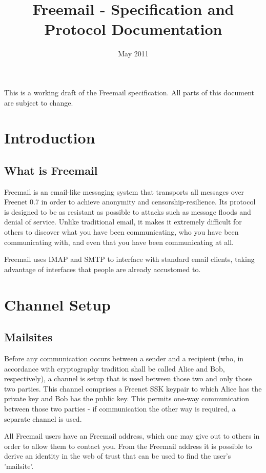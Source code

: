 \documentclass[12pt,a4paper]{article}
\begin{document}
\title{Freemail - Specification and Protocol Documentation}
\date{May 2011}
\maketitle

This is a working draft of the Freemail specification. All parts of this document are subject to
change.

\section{Introduction}
\subsection{What is Freemail}
Freemail is an email-like messaging system that transports all messages over Freenet 0.7 in order to
achieve anonymity and censorship-resilience. Its protocol is designed to be as resistant as possible
to attacks such as message floods and denial of service. Unlike traditional email, it makes it
extremely difficult for others to discover what you have been communicating, who you have been
communicating with, and even that you have been communicating at all.

Freemail uses IMAP and SMTP to interface with standard email clients, taking advantage of interfaces
that people are already accustomed to.

\section{Channel Setup}
\subsection{Mailsites}
Before any communication occurs between a sender and a recipient (who, in accordance with
cryptography tradition shall be called Alice and Bob, respectively), a channel is setup that is used
between those two and only those two parties. This channel comprises a Freenet SSK keypair to which
Alice has the private key and Bob has the public key. This permits one-way communication between
those two parties - if communication the other way is required, a separate channel is used.

All Freemail users have an Freemail address, which one may give out to others in order to allow them
to contact you. From the Freemail address it is possible to derive an identity in the web of trust
that can be used to find the user's 'mailsite'.
\end{document}
